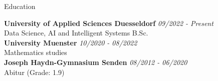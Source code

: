 \documentclass[
	11pt, %
]{resume} %
\begin{document}

\begin{rSection}{Education}
	
	\textbf{University of Applied Sciences Duesseldorf} \hfill \textit{09/2022 - Present} \\ 
	Data Science, AI and Intelligent Systems B.Sc. \\
	
	\textbf{University Muenster} \hfill \textit{10/2020 - 08/2022} \\
	Mathematics studies \\

	\textbf{Joseph Haydn-Gymnasium Senden} \hfill \textit{08/2012 - 06/2020} \\
	Abitur (Grade: 1.9) \\
\end{rSection}

\end{document}
